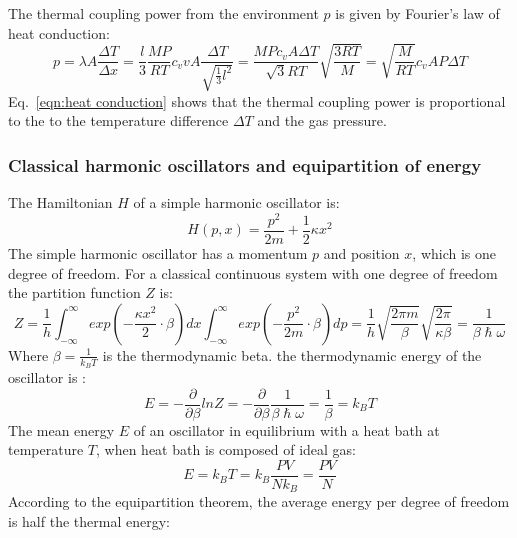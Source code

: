 \documentclass[\main/master.tex]{subfiles}
\begin{document}
The thermal coupling power from the environment $p$ is given by Fourier's law of heat conduction:
\begin{equation}
p =  \lambda A \frac{\Delta T}{\Delta x} =\frac{l}{3} \frac{MP}{RT} c_v v A \frac{\Delta T}{\sqrt{\frac{1}{3} l^2 }} = \frac{M P c_v  A \Delta T}{\sqrt{3}RT} \sqrt{\frac{3RT}{M}} =   \sqrt{\frac{M}{RT}} c_v  A P  \Delta T 
\label{eqn:heat conduction}
\end{equation}
Eq.~\ref{eqn:heat conduction} shows that the thermal coupling power is proportional to the to the temperature difference $\Delta T$ and the gas pressure.
\iffalse
\subsubsection{Classical harmonic oscillators and equipartition of energy}
The Hamiltonian $H$ of a simple harmonic oscillator is:
\begin{equation}
H(p,x) = \frac{p^2}{2m}+\frac{1}{2}\kappa x^2
\label{eqn:Hamiltonian}
\end{equation}
The simple harmonic oscillator has a momentum $p$ and position $x$, which is one degree of freedom. For a classical continuous system with one degree of freedom the partition function $Z$ is:
\begin{equation}
Z = \frac{1}{h}\int_{-\infty}^{\infty}exp(-\frac{\kappa x^2}{2}\cdot \beta)dx \int_{-\infty}^{\infty} exp(-\frac{p^2}{2m}\cdot \beta)dp = 
\frac{1}{h} \sqrt{\frac{2\pi m}{\beta}} \sqrt{\frac{2\pi }{\kappa\beta} } = \frac{1}{\beta\hslash\omega}
\label{eqn:partition function}
\end{equation}
Where $\beta = \frac{1}{k_B T}$ is the thermodynamic beta. the thermodynamic energy of the oscillator is : 
\begin{equation}
E = -\frac{\partial}{\partial\beta}lnZ = -\frac{\partial}{\partial\beta}\frac{1}{\beta\hslash\omega} = \frac{1}{\beta}  = k_B T
\label{eqn:thermodynamic energy}
\end{equation}
The mean energy $E$ of an oscillator in equilibrium with a heat bath at temperature $T$, when heat bath is composed of ideal gas:
\begin{equation}
E = k_B T = k_B\frac{PV}{N k_B} = \frac{PV}{N}
\label{eqn:Brownian uncertainty}
\end{equation}
According to the equipartition theorem, the average energy per degree of freedom is half the thermal
energy:
\end{document}

